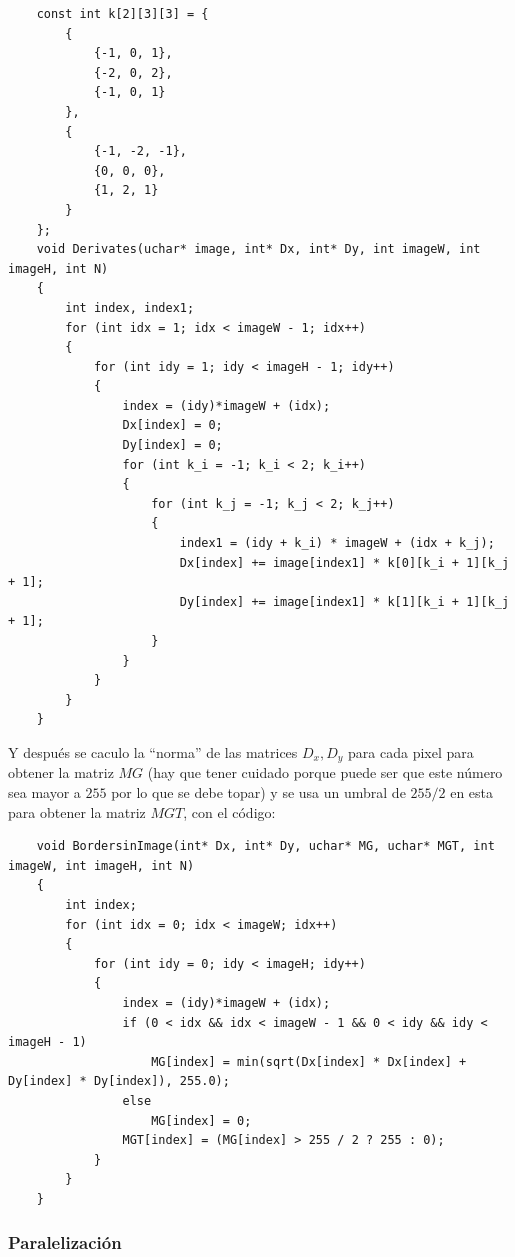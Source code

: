 \documentclass[letterpaper]{article}
\theoremstyle{definition}
\theoremstyle{lemathm}
\theoremstyle{lemathm}
\theoremstyle{lemathm}
\theoremstyle{lemademthm}
\newcommand{\1}{\mathbbm{1}}
\begin{document}
	\begin{verbatim}
	const int k[2][3][3] = {
		{
			{-1, 0, 1},
			{-2, 0, 2},
			{-1, 0, 1}
		},
		{
			{-1, -2, -1},
			{0, 0, 0},
			{1, 2, 1}
		}
	};
	void Derivates(uchar* image, int* Dx, int* Dy, int imageW, int imageH, int N)
	{
		int index, index1;
		for (int idx = 1; idx < imageW - 1; idx++)
		{
			for (int idy = 1; idy < imageH - 1; idy++)
			{
				index = (idy)*imageW + (idx);
				Dx[index] = 0;
				Dy[index] = 0;
				for (int k_i = -1; k_i < 2; k_i++)
				{
					for (int k_j = -1; k_j < 2; k_j++)
					{
						index1 = (idy + k_i) * imageW + (idx + k_j);
						Dx[index] += image[index1] * k[0][k_i + 1][k_j + 1];
						Dy[index] += image[index1] * k[1][k_i + 1][k_j + 1];
					}
				}
			}
		}
	}
	\end{verbatim}

	Y después se caculo la ``norma'' de las matrices $D_x, D_y$ para cada pixel para obtener la matriz $MG$ (hay que tener cuidado porque puede ser que este número sea mayor a $255$ por lo que se debe topar) y se usa un umbral de $255/2$ en esta para obtener la matriz $MGT$, con el código:
	
	\begin{verbatim}
	void BordersinImage(int* Dx, int* Dy, uchar* MG, uchar* MGT, int imageW, int imageH, int N)
	{
		int index;
		for (int idx = 0; idx < imageW; idx++)
		{
			for (int idy = 0; idy < imageH; idy++)
			{
				index = (idy)*imageW + (idx);
				if (0 < idx && idx < imageW - 1 && 0 < idy && idy < imageH - 1)
					MG[index] = min(sqrt(Dx[index] * Dx[index] + Dy[index] * Dy[index]), 255.0);
				else
					MG[index] = 0;
				MGT[index] = (MG[index] > 255 / 2 ? 255 : 0);
			}
		}
	}
	\end{verbatim}

	\newpage

	\subsubsection*{Paralelización}
\end{document}
